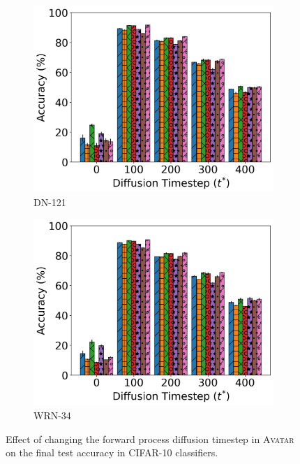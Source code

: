 \documentclass[conference]{IEEEtran}
\theoremstyle{definition}
\theoremstyle{remark}
\theoremstyle{proposition}
\begin{document}
\begin{figure}[tb!]
	\begin{subfigure}{.375\textwidth}
		\centering
		\includegraphics[width=1.0\textwidth]{DN-121_ACC_T_CIFAR-10.jpg}
		\caption{DN-121}
		\label{fig:timestep_ext:dn121}
	\end{subfigure}\hspace*{2em}
	\begin{subfigure}{.375\textwidth}
		\centering
		\includegraphics[width=1.0\textwidth]{WRN-34_ACC_T_CIFAR-10.jpg}
		\caption{WRN-34}
		\label{fig:timestep_ext:wrn34}
	\end{subfigure}
	\caption{Effect of changing the forward process diffusion timestep in \textsc{Avatar} on the final test accuracy in CIFAR-10 classifiers.}
	\label{fig:timestep}
\end{figure}
\end{document}
